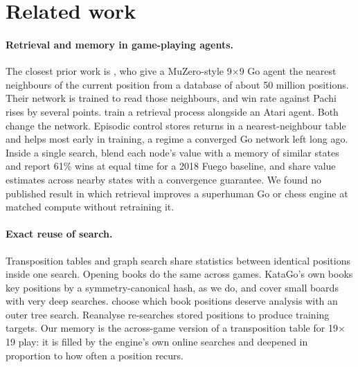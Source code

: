 \section{Related work}
\label{sec:related}

\paragraph{Retrieval and memory in game-playing agents.}
The closest prior work is \citet{humphreys2022retrieval}, who give a MuZero-style 9$\times$9 Go agent the nearest neighbours of the current position from a database of about 50 million positions. Their network is trained to read those neighbours, and win rate against Pachi rises by several points. \citet{goyal2022retrieval} train a retrieval process alongside an Atari agent. Both change the network. Episodic control \citep{blundell2016model,pritzel2017neural} stores returns in a nearest-neighbour table and helps most early in training, a regime a converged Go network left long ago. Inside a single search, \citet{xiao2018memory} blend each node's value with a memory of similar states and report 61\% wins at equal time for a 2018 Fuego baseline, and \citet{srinivasan2015improving} share value estimates across nearby states with a convergence guarantee. We found no published result in which retrieval improves a superhuman Go or chess engine at matched compute without retraining it.

\paragraph{Exact reuse of search.}
Transposition tables \citep{childs2008transpositions} and graph search \citep{czech2021improving,katago_graphsearch} share statistics between identical positions inside one search. Opening books do the same across games. KataGo's own books \citep{katagobooks} key positions by a symmetry-canonical hash, as we do, and cover small boards with very deep searches. \citet{chaslot2009meta} choose which book positions deserve analysis with an outer tree search. Reanalyse \citep{schrittwieser2021online,xuan2024rezero} re-searches stored positions to produce training targets. Our memory is the across-game version of a transposition table for 19$\times$19 play: it is filled by the engine's own online searches and deepened in proportion to how often a position recurs.

